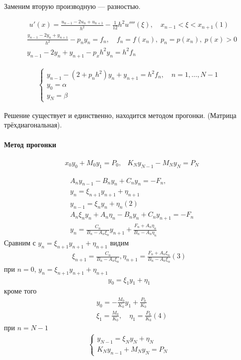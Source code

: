 Заменим вторую производную --- разностью.

\begin{align*}
u'(x) = \frac{u_{n-1} - 2 u_n + u_{n+1}}{h^2} - \frac{1}{12}h^2 u''''(\xi), \quad x_{n-1} < \xi < x_{n+1} (1)
\end{align*}
\begin{align*}
&\frac{y_{n-1} - 2y_n + y_{n+1}}{h^2} - p_n y_n = f_n, \quad f_n = f(x_n),\; p_n = p(x_n),\; p(x) > 0
\\
&y_{n-1} - 2y_n + y_{n+1} - p_x h^2 y_n = h^2 f_n
\end{align*}

\begin{align*}
\begin{cases}
	y_{n-1} - (2 + p_n h^2) y_n + y_{n+1} = h^2 f_n, \quad n = 1, \dots, N - 1\\
	y_0 = \alpha\\
	y_N = \beta
\end{cases}
\end{align*}

Решение существует и единственно, находится методом прогонки. (Матрица трёхдиагональная).

\paragraph{Метод прогонки}

\begin{align*}
&x_0 y_0 + M_0 y_1 = P_0, &K_N y_{N-1} - M_N y_N = P_N
\end{align*}

\begin{align*}
	&A_n y_{n - 1} - B_n y_n + C_n y_n = -F_n, \\
	&y_n = \xi_{n+1} y_{n+1} + \eta_{n+1} \\
	&y_{n-1} = \xi_n y_n + \eta_n (2) \\
	&A_n \xi_n y_n + A_n \eta_n - B_n y_n + C_n y_{n+1} = - F_n \\
	&y_n = \frac{C_n}{B_n - A_n \xi_n} y_{n+1} + \frac{F_n + A_n \eta_n}{B_n - A_n \eta_n}
\end{align*}
Сравним с $y_n = \xi_{n+1} y_{n+1} + \eta_{n+1}$ видим
\begin{align*}
	\xi_{n+1} = \frac{C_n}{B_n - A_n \xi_n}, \eta_{n+1} = \frac{F_n + A_n \xi_n}{B_n - A_n \xi_n} (3)
\end{align*}
при $n = 0$, $y_n = \xi_{n+1} y_{n+1} + \eta_{n+1}$
\begin{align*}
y_0 = \xi_1 y_1 + \eta_1
\end{align*}
кроме того
\begin{align*}
&y_0 = - \frac{M_0}{K_0} y_1 + \frac{P_0}{K_0}\\
&\xi_1 = \frac{M_0}{K_0}, \quad \eta_1 = \frac{P_0}{K_0} (4)
\end{align*}
при $n = N-1$
\begin{align*}
\begin{cases}
	y_{N-1} = \xi_N y_N + \eta_N\\
	K_N y_{n-1} + M_N y_N = P_N
\end{cases}
\end{align*}

